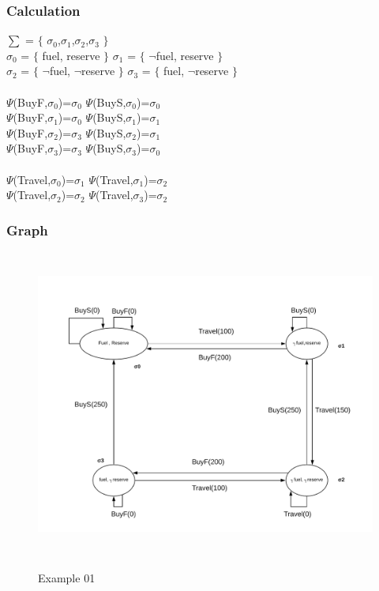 \documentclass[11pt]{article}
\begin{document}
	\subsubsection{Calculation}\label{par:p301}\par
	$\sum$ = $\lbrace$ $\sigma_{0}$,$\sigma_{1}$,$\sigma_{2}$,$\sigma_{3}$ $\rbrace$\\
	$\sigma_{0}$ = $\lbrace$ fuel, reserve $\rbrace$ \indent $\sigma_{1}$ = $\lbrace$ $\neg$fuel, reserve $\rbrace$\\
	$\sigma_{2}$ = $\lbrace$ $\neg$fuel, $\neg$reserve $\rbrace$ \indent $\sigma_{3}$ = $\lbrace$ fuel, $\neg$reserve $\rbrace$\\
	\\
	$\Psi$(BuyF,$\sigma_{0}$)=$\sigma_{0}$ \indent $\Psi$(BuyS,$\sigma_{0}$)=$\sigma_{0}$\\
	$\Psi$(BuyF,$\sigma_{1}$)=$\sigma_{0}$ \indent $\Psi$(BuyS,$\sigma_{1}$)=$\sigma_{1}$\\
	$\Psi$(BuyF,$\sigma_{2}$)=$\sigma_{3}$ \indent $\Psi$(BuyS,$\sigma_{2}$)=$\sigma_{1}$\\
	$\Psi$(BuyF,$\sigma_{3}$)=$\sigma_{3}$ \indent $\Psi$(BuyS,$\sigma_{3}$)=$\sigma_{0}$\\
	\\
	$\Psi$(Travel,$\sigma_{0}$)=$\sigma_{1}$\indent
	$\Psi$(Travel,$\sigma_{1}$)=$\sigma_{2}$\\
	$\Psi$(Travel,$\sigma_{2}$)=$\sigma_{2}$\indent
	$\Psi$(Travel,$\sigma_{3}$)=$\sigma_{2}$\\
	\subsubsection{Graph}\label{par:p401}
	\begin{figure}[H]
		\centering
		\includegraphics[width=5in,height=4in]{./media/ex01.png}
		\label{Figure:f01}
		\caption{Example 01}
	\end{figure}
\end{document}
